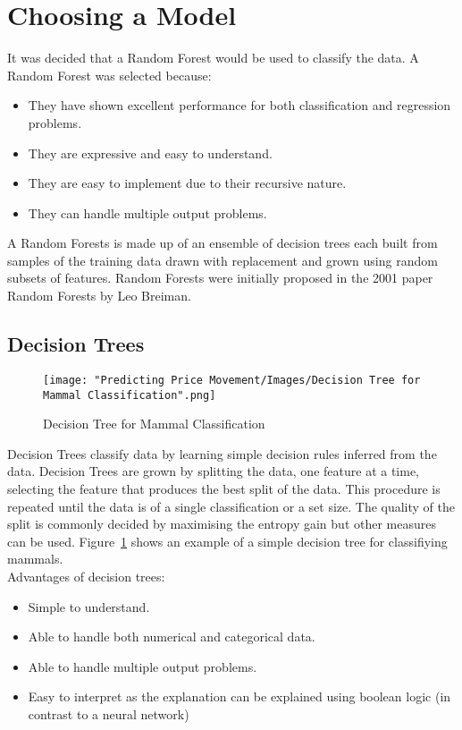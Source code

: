 	\section{Choosing a Model}
		It was decided that a Random Forest would be used to classify the data. A Random Forest was selected because:
		
		\begin{itemize}
			\item They have shown excellent performance for both classification and regression problems.
			\item They are expressive and easy to understand\cite{Flach:2012:MLA:2490546}.
			\item They are easy to implement due to their recursive nature\cite{Flach:2012:MLA:2490546}.
			\item They can handle multiple output problems.
		\end{itemize}		 
		
		A Random Forests is made up of an ensemble of decision trees each built from samples of the training data drawn with replacement and grown using random subsets of features. Random Forests were initially proposed in the 2001 paper Random Forests by Leo Breiman\cite{breiman2001random}. 
			
		\subsection{Decision Trees}			
				
		\begin{figure}[H]
			\texttt{[image: "Predicting Price Movement/Images/Decision Tree for Mammal Classification".png]}
			\centering
			\caption{Decision Tree for Mammal Classification}
    			\label{fig:decisionTree}
		\end{figure}		
								
		Decision Trees classify data by learning simple decision rules inferred from the data. Decision Trees are grown by splitting the data, one feature at a time, selecting the feature that produces the best split of the data. This procedure is repeated until the data is of a single classification or a set size. The quality of the split is commonly decided by maximising the entropy gain\cite{entropy} but other measures can be used. Figure~\ref{fig:decisionTree} shows an example of a simple decision tree for classifiying mammals.\\
		
		Advantages of decision trees:
			\begin{itemize}
				\item Simple to understand.
				\item Able to handle both numerical and categorical data.
				\item Able to handle multiple output problems.
				\item Easy to interpret as the explanation can be explained using boolean logic (in contrast to a neural network)
			\end{itemize}					
		
